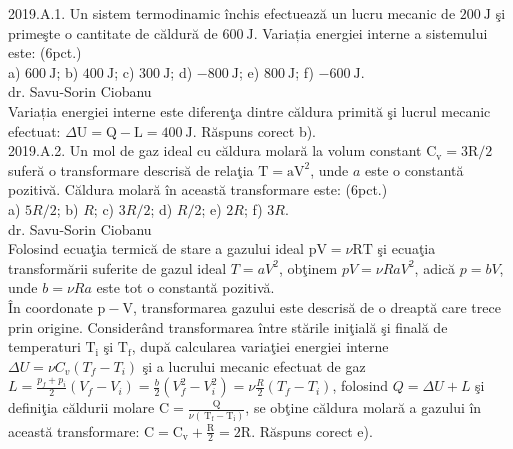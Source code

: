 

2019.A.1. Un sistem termodinamic închis efectuează un lucru mecanic de $200 \mathrm{~J}$ şi primeşte o cantitate de căldură de $600 \mathrm{~J}$. Variația energiei interne a sistemului este: (6pct.)\\ a) $600 \mathrm{~J}$; b) $400 \mathrm{~J}$; c) $300 \mathrm{~J}$; d) $-800 \mathrm{~J}$; e) $800 \mathrm{~J}$; f) $-600 \mathrm{~J}$.\\ dr. Savu-Sorin Ciobanu\\ Variația energiei interne este diferenţa dintre căldura primită şi lucrul mecanic efectuat: $\Delta \mathrm{U}=\mathrm{Q}-\mathrm{L}=400 \mathrm{~J}$. Răspuns corect b).\\

2019.A.2. Un mol de gaz ideal cu căldura molară la volum constant $\mathrm{C}_{\mathrm{v}}=3 \mathrm{R} / 2$ suferă o transformare descrisă de relaţia $\mathrm{T}=\mathrm{aV}^{2}$, unde $a$ este o constantă pozitivă. Căldura molară în această transformare este: (6pct.)\\ a) $5 R / 2$; b) $R$; c) $3 R / 2$; d) $R / 2$; e) $2 R$; f) $3 R$.\\ dr. Savu-Sorin Ciobanu\\ Folosind ecuaţia termică de stare a gazului ideal $\mathrm{pV}=\nu \mathrm{RT}$ şi ecuaţia transformării suferite de gazul ideal $T=a V^{2}$, obţinem $p V=\nu R a V^{2}$, adică $p=b V$, unde $b=\nu R a$ este tot o constantă pozitivă.\\ În coordonate $\mathrm{p}-\mathrm{V}$, transformarea gazului este descrisă de o dreaptă care trece prin origine. Considerând transformarea între stările iniţială şi finală de temperaturi $\mathrm{T}_{\mathrm{i}}$ şi $\mathrm{T}_{\mathrm{f}}$, după calcularea variaţiei energiei interne $\Delta U=\nu C_{v}\left(T_{f}-T_{i}\right)$ şi a lucrului mecanic efectuat de gaz $L=\frac{p_{f}+p_{i}}{2}\left(V_{f}-V_{i}\right)=\frac{b}{2}\left(V_{f}^{2}-V_{i}^{2}\right)=\nu \frac{R}{2}\left(T_{f}-T_{i}\right)$, folosind $Q=\Delta U+L$ şi definiţia căldurii molare $\mathrm{C}=\frac{\mathrm{Q}}{\nu\left(\mathrm{~T}_{\mathrm{f}}-\mathrm{T}_{\mathrm{i}}\right)}$, se obţine căldura molară a gazului în această transformare: $\mathrm{C}=\mathrm{C}_{\mathrm{v}}+\frac{\mathrm{R}}{2}=2 \mathrm{R}$. Răspuns corect e).\\

